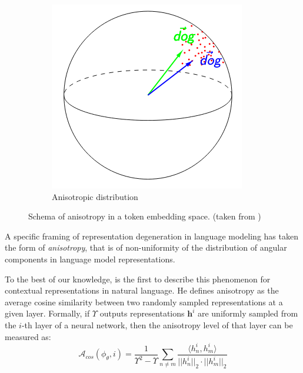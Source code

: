 \begin{figure}[ht]
\begin{subfigure}[b]{0.3\textwidth}
        \includegraphics[width=\textwidth]{sources/related_works/imgs/anisotropy_kawin_2.png}
        \caption{Anisotropic distribution}
        \label{fig:aniso}
    \end{subfigure}
    \caption{Schema of anisotropy in a token embedding space. (taken from \citet{ethayarajh-2019-contextual})}
    \label{fig:anisotropy_rw}
\end{figure}


A specific framing of representation degeneration in language modeling has taken the form of \textit{anisotropy}, that is of non-uniformity of the distribution of angular components in language model representations. 

To the best of our knowledge, \citet{ethayarajh-2019-contextual} is the first to describe this phenomenon for contextual representations in natural language. He defines anisotropy as the average cosine similarity between two randomly sampled representations at a given layer. Formally, if $\Upsilon$ outputs representations $\mathbf{h}^i$ are uniformly sampled from the $i$-th layer of a neural network, then the anisotropy level of that layer can be measured as:
\begin{equation}
    \label{eq:anisotropy_cos_def}
    \mathcal{A}_{cos}(\phi_\theta, i) = \frac{1}{\Upsilon^2 - \Upsilon} \sum_{n \neq m} \frac{\langle h^i_n, h^i_m \rangle}{||h^i_n||_2 \cdot||h^i_m||_2 }
\end{equation}

